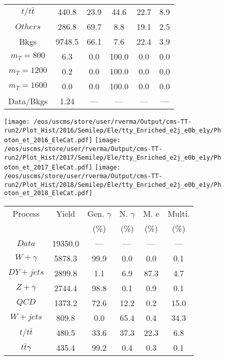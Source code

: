 \begin{figure}
\begin{minipage}[c]{0.32\textwidth}
{\begin{tabular}{cccccc}
$ t/t\bar{t} $ &  440.8 &  23.9 &  44.6 &  22.7 &  8.9\\
$ Others $ &  286.8 &  69.7 &  8.8 &  19.1 &  2.5\\
Bkgs &  9748.5 &  66.1 &  7.6 &  22.4 &  3.9\\
$ m_{T} = 800 $ &  6.3 &  0.0 &  100.0 &  0.0 &  0.0\\
$ m_{T} = 1200 $ &  0.2 &  0.0 &  100.0 &  0.0 &  0.0\\
$ m_{T} = 1600 $ &  0.0 &  0.0 &  100.0 &  0.0 &  0.0\\
Data/Bkgs &  1.24 &  --- &  --- &  --- &  ---\\
\hline
\end{tabular}
}
\end{minipage}
\end{figure}

\begin{figure}
\centering
\texttt{[image: /eos/uscms/store/user/rverma/Output/cms-TT-run2/Plot\_Hist/2016/Semilep/Ele/tty\_Enriched\_e2j\_e0b\_e1y/Photon\_et\_2016\_EleCat.pdf]}
\texttt{[image: /eos/uscms/store/user/rverma/Output/cms-TT-run2/Plot\_Hist/2017/Semilep/Ele/tty\_Enriched\_e2j\_e0b\_e1y/Photon\_et\_2017\_EleCat.pdf]}
\texttt{[image: /eos/uscms/store/user/rverma/Output/cms-TT-run2/Plot\_Hist/2018/Semilep/Ele/tty\_Enriched\_e2j\_e0b\_e1y/Photon\_et\_2018\_EleCat.pdf]}
\begin{minipage}[c]{0.32\textwidth}
\centering
\tiny{
\begin{tabular}{cccccc}
\hline
Process & Yield & Gen. $\gamma$ & N. $\gamma$ & M. e & Multi. \\
 &  & (\%) & (\%) & (\%) & (\%)  \\
\hline
                                                                      $ Data $ &  19350.0 &  --- &  --- &  --- &  ---\\
$ W+\gamma $ &  5878.3 &  99.9 &  0.0 &  0.0 &  0.1\\
$ DY+jets $ &  2899.8 &  1.1 &  6.9 &  87.3 &  4.7\\
$ Z+\gamma $ &  2744.4 &  98.8 &  0.1 &  0.9 &  0.1\\
$ QCD $ &  1373.2 &  72.6 &  12.2 &  0.2 &  15.0\\
$ W+jets $ &  809.8 &  0.0 &  65.4 &  0.4 &  34.3\\
$ t/t\bar{t} $ &  480.5 &  33.6 &  37.3 &  22.3 &  6.8\\
$ t\bar{t}\gamma $ &  435.4 &  99.2 &  0.4 &  0.3 &  0.1\\

\end{tabular}}
\end{minipage}
\end{figure}
